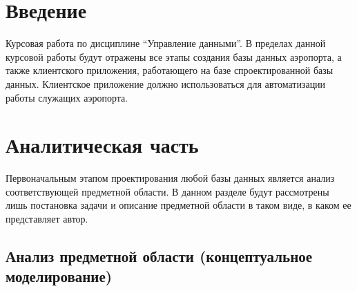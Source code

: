 \documentclass[a4paper,14pt]{extarticle}
\begin{document}
\section*{Введение}
Курсовая работа по дисциплине \enquote{Управление данными}.
В пределах данной курсовой работы будут отражены все этапы создания
базы данных аэропорта, а также клиентского приложения, работающего
на базе спроектированной базы данных. Клиентское приложение должно
использоваться для автоматизации работы служащих аэропорта.

\section{Аналитическая часть}
Первоначальным этапом проектирования любой базы данных является
анализ соответствующей предметной области. В данном разделе будут
рассмотрены лишь постановка задачи и описание предметной области
в таком виде, в каком ее представляет автор.

\subsection{Анализ предметной области (концептуальное моделирование)}
\end{document}
